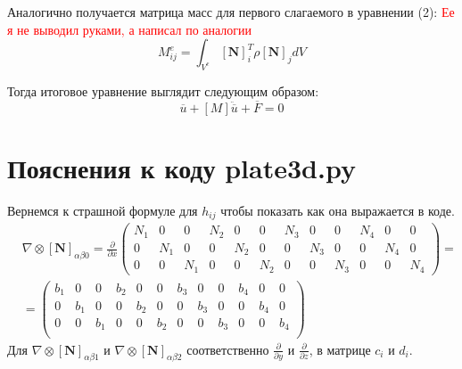 \documentclass[a4paper,12pt]{article}
\begin{document}
Аналогично получается матрица масс для первого слагаемого в уравнении (2):
\textcolor{red}{Ее я не выводил руками, а написал по аналогии}
\begin{equation}
    M_{ij}^e = \int_{V^e} [\textbf{N}]_i^T \rho [\textbf{N}]_j dV
\end{equation}

Тогда итоговое уравнение выглядит следующим образом:
\begin{equation}
    [H]\overline{u} + [M] \ddot{\overline{u}} + \overline{F} = 0
\end{equation}
\section{Пояснения к коду plate3d.py}
Вернемся к страшной формуле для $h_{ij}$ чтобы показать как она выражается в коде. 
\begin{align}
& \nabla \otimes [\textbf{N}]_{\alpha \beta 0} = \frac{\partial}{\partial x}
\begin{pmatrix}
N_1 & 0 & 0 & N_2 & 0 & 0 & N_3 & 0 & 0 & N_4 & 0 & 0 \\
0 & N_1 & 0 & 0 & N_2 & 0 & 0 & N_3 & 0 & 0 & N_4 & 0 \\
0 & 0 & N_1 & 0 & 0 & N_2 & 0 & 0 & N_3 & 0 & 0 & N_4
\end{pmatrix} = \\
&=\begin{pmatrix}
b_1 & 0   & 0   & b_2 & 0   & 0   & b_3 & 0   & 0   & b_4 & 0   & 0 \\
0   & b_1 & 0   & 0   & b_2 & 0   & 0   & b_3 & 0   & 0   & b_4 & 0 \\
0   & 0   & b_1 & 0   & 0   & b_2 & 0   & 0   & b_3 & 0   & 0   & b_4\\
\end{pmatrix}
\end{align}
Для $\nabla \otimes [\textbf{N}]_{\alpha \beta 1}$ и $\nabla \otimes [\textbf{N}]_{\alpha \beta 2}$ соответственно $\frac{\partial}{\partial y}$ и $\frac{\partial}{\partial z}$, в матрице $c_i$ и $d_i $. 
\end{document}
